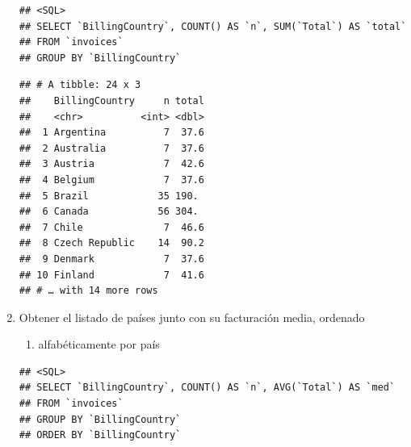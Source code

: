 \documentclass[]{book}
\newenvironment{Shaded}{\begin{snugshade}}{\end{snugshade}}
\newcommand{\DataTypeTok}[1]{\textcolor[rgb]{0.13,0.29,0.53}{#1}}
\newcommand{\KeywordTok}[1]{\textcolor[rgb]{0.13,0.29,0.53}{\textbf{#1}}}
\newcommand{\NormalTok}[1]{#1}
\newcommand{\OperatorTok}[1]{\textcolor[rgb]{0.81,0.36,0.00}{\textbf{#1}}}
\newcommand{\OtherTok}[1]{\textcolor[rgb]{0.56,0.35,0.01}{#1}}
\newcommand{\StringTok}[1]{\textcolor[rgb]{0.31,0.60,0.02}{#1}}
\providecommand{\tightlist}{%
  \setlength{\itemsep}{0pt}\setlength{\parskip}{0pt}}
\begin{document}
\begin{enumerate}
\begin{verbatim}
## <SQL>
## SELECT `BillingCountry`, COUNT() AS `n`, SUM(`Total`) AS `total`
## FROM `invoices`
## GROUP BY `BillingCountry`
\end{verbatim}

\begin{Shaded}
\end{Shaded}

\begin{verbatim}
## # A tibble: 24 x 3
##    BillingCountry     n total
##    <chr>          <int> <dbl>
##  1 Argentina          7  37.6
##  2 Australia          7  37.6
##  3 Austria            7  42.6
##  4 Belgium            7  37.6
##  5 Brazil            35 190. 
##  6 Canada            56 304. 
##  7 Chile              7  46.6
##  8 Czech Republic    14  90.2
##  9 Denmark            7  37.6
## 10 Finland            7  41.6
## # … with 14 more rows
\end{verbatim}
\item
  Obtener el listado de países junto con su facturación media, ordenado

  \begin{enumerate}
  \def\labelenumii{(\alph{enumii})}
  \tightlist
  \item
    alfabéticamente por país
  \end{enumerate}

\begin{Shaded}
\end{Shaded}

\begin{verbatim}
## <SQL>
## SELECT `BillingCountry`, COUNT() AS `n`, AVG(`Total`) AS `med`
## FROM `invoices`
## GROUP BY `BillingCountry`
## ORDER BY `BillingCountry`
\end{verbatim}


\end{enumerate}
\end{document}
